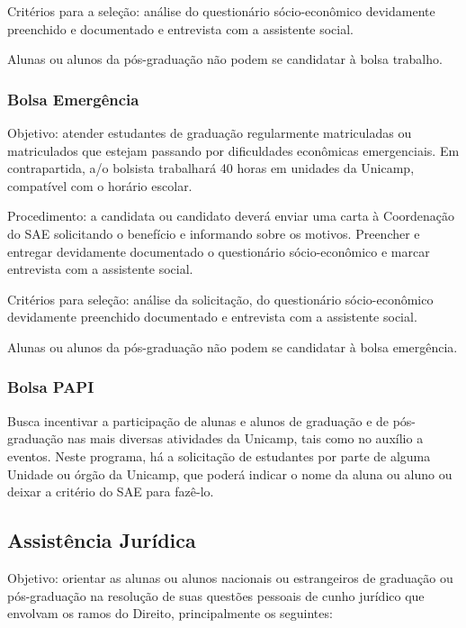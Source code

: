 Critérios para a seleção: análise do questionário sócio-econômico devidamente
preenchido e documentado e entrevista com a assistente social.

Alunas ou alunos da pós-graduação não podem se candidatar à bolsa trabalho.

\subsubsection{Bolsa Emergência}

Objetivo: atender estudantes de graduação regularmente matriculadas ou
matriculados que estejam passando por dificuldades econômicas emergenciais. Em
contrapartida, a/o bolsista trabalhará 40 horas em unidades da Unicamp,
compatível com o horário escolar.

Procedimento: a candidata ou candidato deverá enviar uma carta à Coordenação do
SAE solicitando o benefício e informando sobre os motivos. Preencher e entregar
devidamente documentado o questionário sócio-econômico e marcar entrevista com
a assistente social.

Critérios para seleção: análise da solicitação, do questionário sócio-econômico
devidamente preenchido documentado e entrevista com a assistente social.

Alunas ou alunos da pós-graduação não podem se candidatar à bolsa emergência.

\subsubsection{Bolsa PAPI}

Busca incentivar a participação de alunas e alunos de graduação e de
pós-graduação nas mais diversas atividades da Unicamp, tais como no auxílio a
eventos. Neste programa, há a solicitação de estudantes por parte de alguma
Unidade ou órgão da Unicamp, que poderá indicar o nome da aluna ou aluno ou
deixar a critério do SAE para fazê-lo.

\subsection{Assistência Jurídica}

Objetivo: orientar as alunas ou alunos nacionais ou estrangeiros de graduação
ou pós-graduação na resolução de suas questões pessoais de cunho jurídico que
envolvam os ramos do Direito, principalmente os seguintes:

